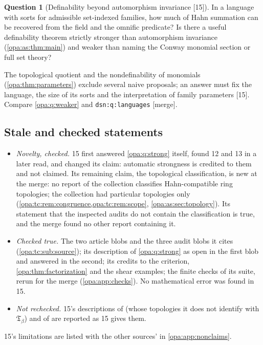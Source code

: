 \documentclass[11pt,oneside]{article}
\numberwithin{equation}{section}
\theoremstyle{definition}
\newtheorem{question}[question]{Question}
\theoremstyle{remark}
\newcommand{\src}[1]{\textup{\textsf{\small[#1]}}}
\newcommand{\mergetag}{\textup{\textsf{\small[merge]}}}
\newcommand{\lbl}[1]{\nolinkurl{#1}}
\begin{document}
\begin{question}[Definability beyond automorphism invariance \src{15}]\label{opa:tc:q:definability}
In a language with sorts for admissible set-indexed families, how much of Hahn summation can be recovered
from the field and the omnific predicate? Is there a useful definability theorem strictly stronger than
automorphism invariance (\cref{opa:as:thm:main}) and weaker than naming the Conway monomial section or full set
theory?
\end{question}
The topological quotient and the nondefinability of monomials (\cref{opa:thm:parameters}) exclude several naive
proposals; an answer must fix the language, the size of its sorts and the interpretation of family
parameters \src{15}. Compare \cref{opa:q:weaker} and \lbl{dsn:q:languages} \mergetag.

\subsection{Stale and checked statements}\label{opa:tc:sub:stale}

\begin{itemize}[itemsep=2pt]
\item \emph{Novelty, checked.} 15 first answered \cref{opa:q:strong} itself, found 12 and 13 in a later read,
and changed its claim: automatic strongness is credited to them and not claimed. Its remaining claim, the
topological classification, is new at the merge: no report of the collection classifies Hahn-compatible
ring topologies; the collection had particular topologies only (\cref{opa:tc:rem:congruence,opa:tc:rem:scope},
\cref{opa:as:sec:topology}). Its statement that the inspected audits do not contain the classification is
true, and the merge found no other report containing it.
\item \emph{Checked true.} The two article blobs and the three audit blobs it cites (\cref{opa:tc:sub:source}); its
description of \cref{opa:q:strong} as open in the first blob and answered in the second; its credits to the
criterion, \cref{opa:thm:factorization} and the shear examples; the finite checks of its suite, rerun for the
merge (\cref{opa:app:checks}). No mathematical error was found in 15.
\item \emph{Not rechecked.} 15's descriptions of \cite{FS} (whose topologies it does not identify with
$\mathfrak T_\beta$) and of \cite{BCJS,BKKPS} are reported as 15 gives them.
\end{itemize}

15's limitations are listed with the other sources' in \cref{opa:app:nonclaims}.
\end{document}
